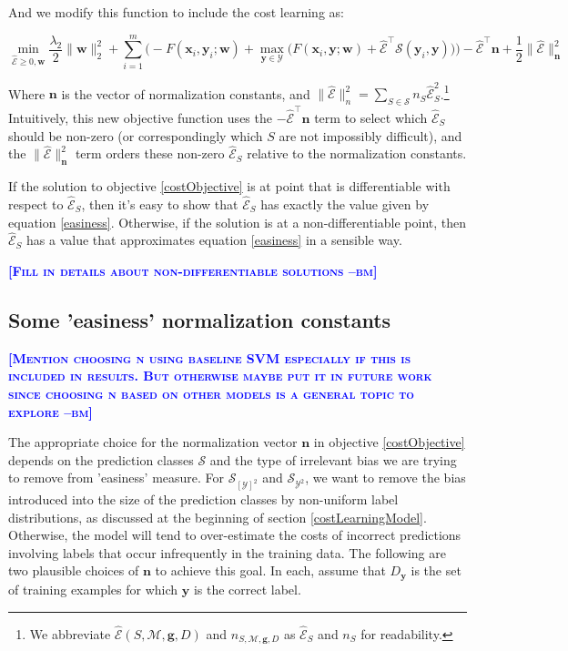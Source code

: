\documentclass{article} %
\newcommand{\bmcomment}[1]{\textcolor{blue}{\textsc{\textbf{[#1 --bm]}}}}
\begin{document}
And we modify this function to include the cost learning as:

\begin{equation}
\label{costObjective}
\min_{\mathbf{\mathcal{\hat{E}}}\geq 0,\mathbf{w}} \frac{\lambda_2}{2}\|\mathbf{w}\|_2^2 + \sum_{i=1}^m\bigg(-F(\mathbf{x}_i,\mathbf{y}_i;\mathbf{w})+\max_{\mathbf{y}\in \mathcal{Y}}\Big(F(\mathbf{x}_i,\mathbf{y};\mathbf{w})+\mathbf{\mathcal{\hat{E}}}^\top \mathbf{\mathcal{S}}(\mathbf{y}_i,\mathbf{y})\Big)\bigg)-\mathbf{\mathcal{\hat{E}}}^\top\mathbf{n}+\frac{1}{2}\|\mathbf{\mathcal{\hat{E}}}\|^2_\mathbf{n}
\end{equation}

Where $\mathbf{n}$ is the vector of normalization constants, and 
$\|\mathbf{\mathcal{\hat{E}}}\|^2_n=\sum_{S\in\mathcal{S}}n_S\mathcal{\hat{E}}_S^2$.\footnote{
  We abbreviate $\mathcal{\hat{E}}(S,\mathcal{M},\mathbf{g},D)$ and 
 $n_{S,\mathcal{M},\mathbf{g},D}$ as $\mathcal{\hat{E}}_S$ and $n_S$ for 
 readability.
}
Intuitively, this new objective function uses the 
$-\mathbf{\mathcal{\hat{E}}}^\top\mathbf{n}$ term to select which 
$\mathcal{\hat{E}}_S$
should be non-zero (or correspondingly which $S$ are not 
impossibly difficult), and the $\|\mathcal{\hat{E}}\|^2_\mathbf{n}$ term orders
these non-zero $\mathcal{\hat{E}}_S$ relative to 
the normalization constants.

If the solution to objective \ref{costObjective} is at point that is 
differentiable with respect to $\mathcal{\hat{E}}_S$, then it's easy to 
show that $\mathcal{\hat{E}}_S$ has exactly the value given by 
equation \ref{easiness}.
Otherwise, if the solution is at a non-differentiable point, then 
$\mathcal{\hat{E}}_S$ has a value that approximates equation \ref{easiness}
in a sensible way.  

\bmcomment{Fill in details about non-differentiable solutions}

\subsection{Some 'easiness' normalization constants}

\bmcomment{Mention choosing n using baseline 
SVM especially if this is included in results.  But otherwise
maybe put it in future work since choosing n based on other
models is a general topic to explore}

The appropriate choice for the normalization vector $\mathbf{n}$ in 
objective \ref{costObjective} depends on the prediction classes
$\mathcal{S}$ and the type of irrelevant bias we are trying to
remove from 'easiness' measure. For $\mathcal{S}_{[\mathcal{Y}]^2}$
and $\mathcal{S}_{\mathcal{Y}^2}$, we want to remove the bias introduced
into the size of the prediction classes by non-uniform label 
distributions, as discussed at the beginning of section
\ref{costLearningModel}.  Otherwise, the model will tend to over-estimate
the costs of incorrect predictions involving labels that occur 
infrequently in the training data.  The following are two 
plausible choices of $\mathbf{n}$ to achieve this goal. In each,
assume that $D_\mathbf{y}$ is the set of training examples
for which $\mathbf{y}$ is the correct label.
\end{document}
